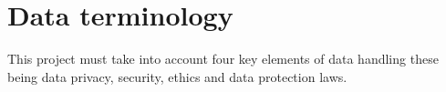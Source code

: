 \documentclass[12pt]{report}
\begin{document}





\section{Data terminology}\label{sec:dataTerms} %
This project must take into account four key elements of data handling these being data privacy, security, 
ethics and data protection laws. 
\end{document}
